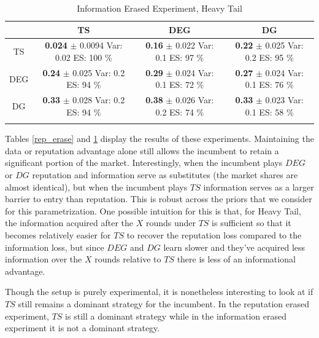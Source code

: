 \documentclass{article}
\theoremstyle{definition}
\begin{document}
\begin{table}[ht]
\centering
\caption{Information Erased Experiment, Heavy Tail} 
\begin{tabular}{c@{\hspace{1.0\tabcolsep}}ccc}
  \hline
 & TS & DEG &  DG \\ 
  \hline
TS & \makecell{\textbf{ 0.024 } $\pm$ 0.0094 \\Var: 0.02 \\ ES: 100 \%} & \makecell{\textbf{ 0.16 } $\pm$ 0.022 \\Var: 0.1 \\ ES: 97 \%} & \makecell{\textbf{ 0.22 } $\pm$ 0.025 \\Var: 0.2 \\ ES: 95 \%} \\ 
  DEG & \makecell{\textbf{ 0.24 } $\pm$ 0.025 \\Var: 0.2 \\ ES: 94 \%} & \makecell{\textbf{ 0.29 } $\pm$ 0.024 \\Var: 0.1 \\ ES: 72 \%} & \makecell{\textbf{ 0.27 } $\pm$ 0.024 \\Var: 0.1 \\ ES: 76 \%} \\ 
   DG & \makecell{\textbf{ 0.33 } $\pm$ 0.028 \\Var: 0.2 \\ ES: 94 \%} & \makecell{\textbf{ 0.38 } $\pm$ 0.026 \\Var: 0.2 \\ ES: 74 \%} & \makecell{\textbf{ 0.33 } $\pm$ 0.023 \\Var: 0.1 \\ ES: 58 \%} \\ 
   \hline
   \label{info_erase}
\end{tabular}
\end{table}

Tables \ref{rep_erase} and \ref{info_erase} display the results of these experiments. Maintaining the data or reputation advantage alone still allows the incumbent to retain a significant portion of the market. Interestingly, when the incumbent plays $DEG$ or $DG$ reputation and information serve as substitutes (the market shares are almost identical), but when the incumbent plays $TS$ information serves as a larger barrier to entry than reputation. This is robust across the priors that we consider for this parametrization. One possible intuition for this is that, for Heavy Tail, the information acquired after the $X$ rounds under $TS$ is sufficient so that it becomes relatively easier for $TS$ to recover the reputation loss compared to the information loss, but since $DEG$ and $DG$ learn slower and they've acquired less information over the $X$ rounds relative to $TS$ there is less of an informational advantage.

Though the setup is purely experimental, it is nonetheless interesting to look at if $TS$ still remains a dominant strategy for the incumbent. In the reputation erased experiment, $TS$ is still a dominant strategy while in the information erased experiment it is not a dominant strategy.


\end{document}
